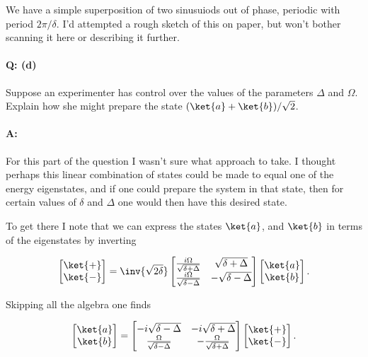 We have a simple superposition of two sinusuiods out of phase, periodic with period $2 \pi/\delta$.  I'd attempted a rough sketch of this on paper, but won't bother scanning it here or describing it further.

\paragraph{Q: (d)}

Suppose an experimenter has control over the values of the parameters $\Delta$ and $\Omega$.  Explain how she might prepare the state $(\ket{a} + \ket{b})/\sqrt{2}$.

\paragraph{A:}

For this part of the question I wasn't sure what approach to take.  I thought perhaps this linear combination of states could be made to equal one of the energy eigenstates, and if one could prepare the system in that state, then for certain values of $\delta$ and $\Delta$ one would then have this desired state.

To get there I note that we can express the states $\ket{a}$, and $\ket{b}$ in terms of the eigenstates by inverting

\begin{equation}\label{eqn:qmIexamPractice2008Dec:2:150}
\begin{bmatrix}
\ket{+} \\
\ket{-} \\
\end{bmatrix}
=\inv{\sqrt{2\delta}}
\begin{bmatrix}
\frac{i \Omega}{\sqrt{\delta + \Delta}} & \sqrt{\delta + \Delta} \\
\frac{i \Omega}{\sqrt{\delta - \Delta}} & -\sqrt{\delta - \Delta}
\end{bmatrix}
\begin{bmatrix}
\ket{a} \\
\ket{b} \\
\end{bmatrix}.
\end{equation}

Skipping all the algebra one finds

\begin{equation}\label{eqn:qmIexamPractice2008Dec:2:160}
\begin{bmatrix}
\ket{a} \\
\ket{b} \\
\end{bmatrix}
=
\begin{bmatrix}
-i\sqrt{\delta - \Delta} & -i\sqrt{\delta + \Delta} \\
\frac{\Omega}{\sqrt{\delta - \Delta}} &
-\frac{\Omega}{\sqrt{\delta + \Delta}} 
\end{bmatrix}
\begin{bmatrix}
\ket{+} \\
\ket{-} \\
\end{bmatrix}.
\end{equation}

